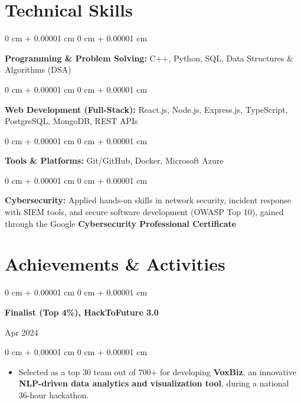 \documentclass[10pt, letterpaper]{article}
\newenvironment{highlights}{
    \begin{itemize}[
        topsep=0.10 cm,
        parsep=0.10 cm,
        partopsep=0pt,
        itemsep=0pt,
        leftmargin=0 cm + 10pt
    ]
}{
    \end{itemize}
} %
\newenvironment{onecolentry}{
    \begin{adjustwidth}{
        0 cm + 0.00001 cm
    }{
        0 cm + 0.00001 cm
    }
}{
    \end{adjustwidth}
} %
\newenvironment{twocolentry}[2][]{
    \onecolentry
    \def\secondColumn{#2}
    \setcolumnwidth{\fill, 4.5 cm}
    \begin{paracol}{2}
}{
    \switchcolumn \raggedleft \secondColumn
    \end{paracol}
    \endonecolentry
} %
\begin{document}
    \section{Technical Skills}

        \begin{onecolentry}
    \textbf{Programming \& Problem Solving:} C++, Python, SQL, Data Structures \& Algorithms (DSA)
\end{onecolentry}

\vspace{0.2 cm}

\begin{onecolentry}
    \textbf{Web Development (Full-Stack):} React.js, Node.js, Express.js, TypeScript, PostgreSQL, MongoDB, REST APIs
\end{onecolentry}

\vspace{0.2 cm}

\begin{onecolentry}
    \textbf{Tools \& Platforms:} Git/GitHub, Docker, Microsoft Azure
\end{onecolentry}

\vspace{0.2 cm}

\begin{onecolentry}
    \textbf{Cybersecurity:} Applied hands-on skills in network security, incident response with SIEM tools, and secure software development (OWASP Top 10), gained through the Google \textbf{Cybersecurity Professional Certificate}
\end{onecolentry}

    \section{Achievements \& Activities}

\begin{twocolentry}{
    Apr 2024
}
    \textbf{\textcolor{blueHighlight}{Finalist (Top 4\%), HackToFuture 3.0}}
\end{twocolentry}

\vspace{0.05 cm}
\begin{onecolentry}
    \begin{highlights}
        \item Selected as a top 30 team out of 700+ for developing \textbf{VoxBiz}, an innovative \textbf{NLP-driven data analytics and visualization tool}, during a national 36-hour hackathon.
    \end{highlights}
\end{onecolentry}
\end{document}
